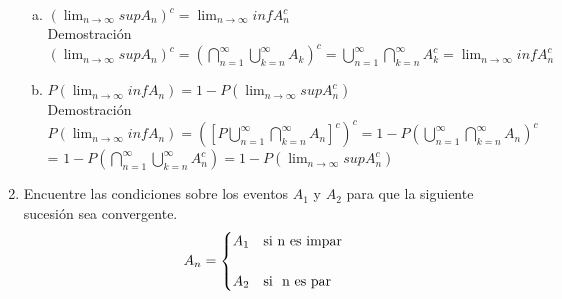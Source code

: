\documentclass[12pt]{article}
\begin{document}
\begin{enumerate}
\begin{enumerate}[a)]
\item $\left(\displaystyle\lim_{n\longrightarrow \infty}{sup}A_n\right)^c =\displaystyle\lim_{n\longrightarrow \infty} {inf}{A_n^c} $\\[0.2cm]
Demostración\\[0.2cm]
$\left(\displaystyle\lim_{n\longrightarrow \infty}{sup}A_n\right)^c =\left(\displaystyle\bigcap_{n=1}^{\infty}\displaystyle\bigcup_{k=n}^{\infty}{A_k}\right)^c =\displaystyle\bigcup_{n=1}^{\infty}\displaystyle\bigcap_{k=n}^{\infty}{A_k^c} = \displaystyle\lim_{n\longrightarrow \infty} {inf}{A_n^c} $

\item $P\left(\displaystyle\lim_{n\longrightarrow \infty}{inf}A_n\right) =1-P\left(\displaystyle\lim_{n\longrightarrow \infty}{sup}A_n^c\right)$\\[0.2cm]
Demostración\\[0.2cm]
 $P\left(\displaystyle\lim_{n\longrightarrow \infty}{inf}A_n\right)=\left([P\displaystyle\bigcup_{n=1}^{\infty}\displaystyle\bigcap_{k=n}^{\infty}{A_n}]^c\right)^c = 1-P\left(\displaystyle\bigcup_{n=1}^{\infty}\displaystyle\bigcap_{k=n}^{\infty}{A_n}\right)^c  $\\[0.2cm]
 = $ 1-P\left(\displaystyle\bigcap_{n=1}^{\infty}\displaystyle\bigcup_{k=n}^{\infty}{A_n^c}\right)= 1-P\left(\displaystyle\lim_{n\longrightarrow \infty}{sup}A_n^c\right) $
 

\end{enumerate}

\item Encuentre las condiciones sobre los eventos $A_1$ y $A_2$ para que la siguiente sucesión sea convergente.
\[A_n = \begin{cases} 
     A_1  & \mbox{si } $n es impar$   \\[0.5cm]
      A_2  & \mbox{si }$ n es par$
 \end{cases} \]

\end{enumerate}
\end{document}
